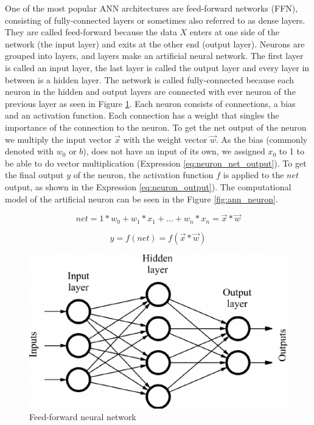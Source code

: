 \documentclass[times, utf8, diplomski]{fer}
\begin{document}
One of the most popular ANN architectures are feed-forward networks (FFN), consisting of fully-connected layers or sometimes also referred to as dense layers. They are called feed-forward because the data $X$ enters at one side of the network (the input layer) and exits at the other end (output layer). Neurons are grouped into layers, and layers make an artificial neural network. The first layer is called an input layer, the last layer is called the output layer and every layer in between is a hidden layer. The network is called fully-connected because each neuron in the hidden and output layers are connected with ever neuron of the previous layer as seen in Figure \ref{fig:ann}.
Each neuron consists of connections, a bias and an activation function. Each connection has a weight that singles the importance of the connection to the neuron. To get the net output of the neuron we multiply the input vector $\vec{x}$ with the weight vector $\vec{w}$. As the bias (commonly denoted with $w_0$ or $b$), does not have an input of its own, we assigned $x_0$ to 1 to be able to do vector multiplication (Expression \ref{eq:neuron_net_output}). To get the final output $y$ of the neuron, the activation function $f$ is applied to the $net$ output, as shown in the Expression \ref{eq:neuron_output}). The computational model of the artificial neuron can be seen in the Figure \ref{fig:ann_neuron}.

\begin{equation}
    \label{eq:neuron_net_output}
    net = 1*w_0 + w_1*x_1 + ... + w_n*x_n = \vec{x} * \vec{w}
\end{equation}

\begin{equation}
    \label{eq:neuron_output}
    y = f(net) = f(\vec{x}*\vec{w})
\end{equation}

\begin{figure}
  \includegraphics[width=\linewidth]{figures/ann.png}
  \caption{Feed-forward neural network}
  \label{fig:ann}
\end{figure}
\end{document}
